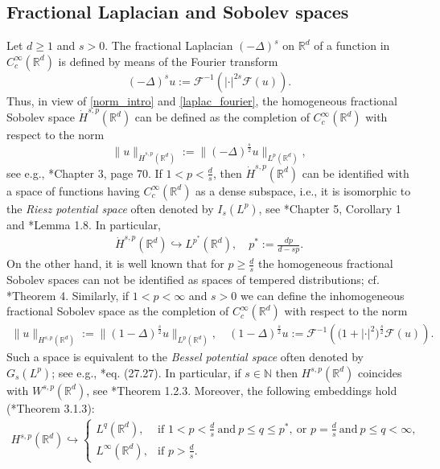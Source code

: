 \documentclass[letterpaper, 11pt,  reqno]{amsart}
\theoremstyle{definition}
\theoremstyle{remark}
\numberwithin{equation}{section}
\newcommand{\bbr}{\mathbb{R}}
\newcommand{\N}{{\mathbb N}}
\newcommand{\R}{{\mathbb R}}
\begin{document}
\subsection*{Fractional Laplacian and Sobolev spaces}
\noindent Let $d\ge 1$ and $s>0$. The fractional Laplacian $(-\Delta)^{s}$  on $\mathbb{R}^d$ of a function in $C^{\infty}_c(\R^d)$ is defined by means of the Fourier transform
\begin{equation}\label{laplac_fourier}
	(-\Delta)^{s}u:=\mathscr{F}^{-1}\left({|\cdot|}^{2s}\mathscr{F}(u)\right).
\end{equation}
Thus, in view of \eqref{norm_intro} and \eqref{laplac_fourier},  the homogeneous fractional Sobolev space $\dot{H}^{s,p}(\bbr^d)$ can be defined as the completion of $C^{\infty}_c(\R^d)$ with respect to the norm
\begin{equation*}
	\|u\|_{\dot{H}^{s,p}(\bbr^d)}:=\|(-\Delta)^{\frac
	{s}{2}}u\|_{L^p(\R^d)},
\end{equation*}
see e.g., \cite{mult_mazya}*{Chapter 3, page 70}. If $1<p<\frac{d}{s}$, then $\dot H^{s,p}(\R^d)$ can be identified with a space of functions having $C^{\infty}_c(\R^d)$ as a dense subspace, i.e., it is isomorphic to the \textit{Riesz potential space} often denoted by $I_{s}(L^p)$, see \cite{Samko}*{Chapter 5, Corollary 1} and  \cite{mazya}*{Lemma 1.8}. In particular, 
\begin{align}\label{hom_embedding}
\dot H^{s,p}(\R^d)\hookrightarrow L^{p^*}(\R^d),\quad  p^*:=\frac{dp}{d-sp}.
\end{align}
 On the other hand, it is well known that for $p\ge  \frac
{d}{s}$ the homogeneous fractional Sobolev spaces can not be identified as spaces of tempered distributions; cf. \cite{realization}*{Theorem 4}.
Similarly, if $1<p<\infty$ and $s>0$ we can define the inhomogeneous fractional Sobolev space as the completion of $C^{\infty}_c(\R^d)$ with respect to the norm
\begin{align*}
\|u\|_{H^{s,p}(\R^d)}:=\|{(1-\Delta)}^{\frac{s}{2}}u\|_{L^p(\R^d)},\quad {(1-\Delta)}^{\frac{s}{2}}u:=\mathscr{F}^{-1}\left({(1+|\cdot|}^{2})^{\frac{s}{2}}\mathscr{F}(u)\right).
\end{align*}
Such a space is equivalent to the \textit{Bessel potential space} often denoted by $G_s(L^p)$; see e.g.,  \cite{Samko}*{eq. (27.27)}. In particular, if $s\in \N$ then $H^{s,p}(\R^d)$ coincides with $W^{s,p}(\R^d)$, see \cite{Adams}*{Theorem 1.2.3}. Moreover, the following embeddings hold (\cite{mult_mazya}*{Theorem 3.1.3}):
\begin{align}\label{embeddings_in}
H^{s,p}(\R^d)\hookrightarrow \begin{cases} L^{q}(\R^d), & \mbox{if }1<p<\frac{d}{s}\ \text{and}\  p\le q\le p^*,\ \mbox{or }p=\frac{d}{s}\ \text{and}\  p\le q<\infty,  \\ L^{\infty}(\R^d), & \mbox{if }p>\frac{d}{s}.
\end{cases}
\end{align}
\end{document}

